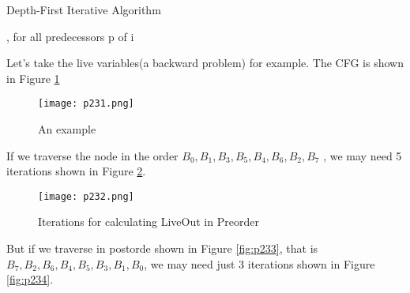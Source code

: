 \begin{algorithm}[H]
	\caption{Depth-First Iterative Algorithm}\label{alg:Reverse Postorder}
	\begin{algorithmic}
		\EndFunction

		\EndFor
		\EndFunction
		\EndFor
		\EndFor
		, for all predecessors p of i
		\EndIf
		\EndFor
		\EndWhile
	\end{algorithmic}
\end{algorithm}



Let's take the live variables(a backward problem) for example. The CFG is shown in
Figure \ref{fig:p231}


\begin{figure}[H]
	\centering
	\texttt{[image: p231.png]}
	\caption{An example}
	\label{fig:p231}
\end{figure}



If we traverse the node in the order
$B_0, B_1, B_3, B_5, B_4, B_6,B_2,B_7$
, we may need 5 iterations shown in Figure \ref{fig:p232}.

\begin{figure}[H]
	\centering
	\texttt{[image: p232.png]}
	\caption{Iterations for calculating LiveOut in Preorder}
	\label{fig:p232}
\end{figure}




But if we traverse in postorde shown in Figure \ref{fig:p233}, that is $B_7, B_2, B_6,B_4,B_5,B_3,B_1,B_0$,
we may need just 3 iterations shown in Figure \ref{fig:p234}.


